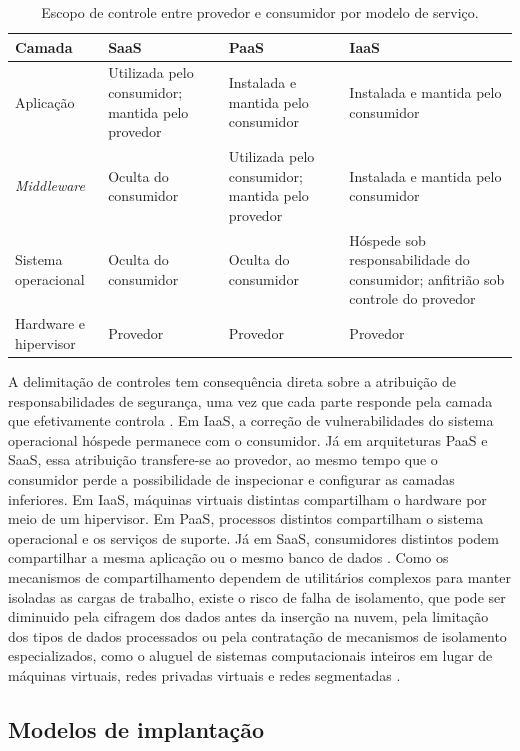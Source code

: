 \begin{table}[H]
	\centering
	\caption{Escopo de controle entre provedor e consumidor por modelo de serviço.}
	\label{tab:escopo-controle}
	\footnotesize
	\renewcommand{\arraystretch}{1.2}
	\begin{tabularx}{\textwidth}{@{} l X X X @{}}
		\toprule
		\textbf{Camada} & \textbf{SaaS} & \textbf{PaaS} & \textbf{IaaS} \\
		\midrule
		Aplicação & Utilizada pelo consumidor; mantida pelo provedor & Instalada e mantida pelo consumidor & Instalada e mantida pelo consumidor \\
		\emph{Middleware} & Oculta do consumidor & Utilizada pelo consumidor; mantida pelo provedor & Instalada e mantida pelo consumidor \\
		Sistema operacional & Oculta do consumidor & Oculta do consumidor & Hóspede sob responsabilidade do consumidor; anfitrião sob controle do provedor \\
		Hardware e hipervisor & Provedor & Provedor & Provedor \\
		\bottomrule
	\end{tabularx}
\end{table}

A delimitação de controles tem consequência direta sobre a atribuição de responsabilidades de segurança, uma vez que cada parte responde pela camada que efetivamente controla \cite{liu2011nist}. Em IaaS, a correção de vulnerabilidades do sistema operacional hóspede permanece com o consumidor. Já em arquiteturas PaaS e SaaS, essa atribuição transfere-se ao provedor, ao mesmo tempo que o consumidor perde a possibilidade de inspecionar e configurar as camadas inferiores. Em IaaS, máquinas virtuais distintas compartilham o hardware por meio de um hipervisor. Em PaaS, processos distintos compartilham o sistema operacional e os serviços de suporte. Já em SaaS, consumidores distintos podem compartilhar a mesma aplicação ou o mesmo banco de dados \cite{badger2012cloud}. Como os mecanismos de compartilhamento dependem de utilitários complexos para manter isoladas as cargas de trabalho, existe o risco de falha de isolamento, que pode ser diminuido pela cifragem dos dados antes da inserção na nuvem, pela limitação dos tipos de dados processados ou pela contratação de mecanismos de isolamento especializados, como o aluguel de sistemas computacionais inteiros em lugar de máquinas virtuais, redes privadas virtuais e redes segmentadas \cite{badger2012cloud}.

\subsection{Modelos de implantação}

